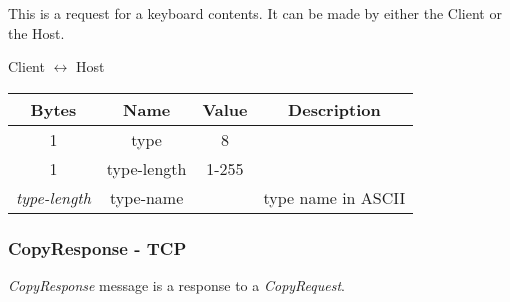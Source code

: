 \documentclass{article}
\begin{document}
    This is a request for a keyboard contents. It can be made by either the Client or the Host.

    \begin{center}
        Client $\leftrightarrow$ Host\\
        \begin{tabular}{|c|c|c|c|}
            \hline
            \textbf{Bytes}     & \textbf{Name} & \textbf{Value} & \textbf{Description} \\
            \hline
            1                  & type          & 8              &                      \\
            \hline
            1                  & type-length   & 1-255          &                      \\
            \hline
            \emph{type-length} & type-name     &                & type name in ASCII   \\
            \hline
        \end{tabular}
    \end{center}

    \subsubsection{CopyResponse - TCP}

    \emph{CopyResponse} message is a response to a \emph{CopyRequest}.
\end{document}
